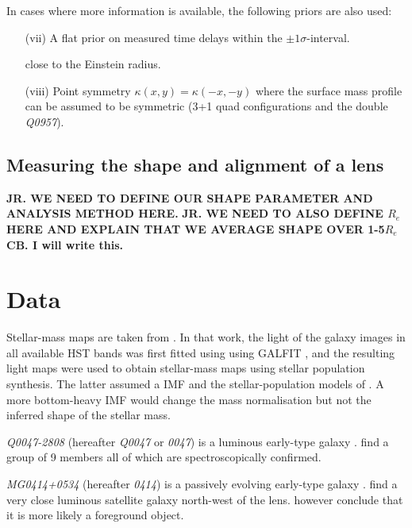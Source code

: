 \documentclass[useAMS,usenatbib]{mn2e}
\begin{document}
In cases where more information is available, the following priors are also used:

\begin{enumerate}
\item[(vii)] A flat prior on measured time delays within the $\pm 1\sigma$-interval.

close to the Einstein radius.

\item[(viii)] Point symmetry $\kappa(x,y) = \kappa(-x,-y)$ where 
the surface mass profile can be assumed to be symmetric (3+1 quad
configurations and the double \textit{Q0957}).

\end{enumerate}

\subsection{Measuring the shape and alignment of a lens}\label{sec:shapemethod}

{\bf JR. WE NEED TO DEFINE OUR SHAPE PARAMETER AND ANALYSIS METHOD HERE.} 
{\bf JR. WE NEED TO ALSO DEFINE $R_e$ HERE AND EXPLAIN THAT WE AVERAGE SHAPE OVER 1-5$R_e$} 
{\bf CB. I will write this.} 


\section{Data}\label{sec:data}

Stellar-mass maps are taken from \cite{2011ApJ...740...97L}.  In that
work, the light of the galaxy images in all available HST bands was
first fitted using using GALFIT \citep{2002AJ....124..266P}, and the
resulting light maps were used to obtain stellar-mass maps using
stellar population synthesis.  The latter assumed a
\cite{2003PASP..115..763C} IMF and the stellar-population models of
\cite{2003MNRAS.344.1000B}.  A more bottom-heavy IMF would change the
mass normalisation \citep[cf.][]{2014ApJ...793...96S} but not the
inferred shape of the stellar mass.

\textit{Q0047-2808} (hereafter \textit{Q0047} or \textit{0047}) is a luminous early-type galaxy \citep{1996MNRAS.278..139W}. \cite{2011ApJ...726...84W} find a group of 9 members all of which are spectroscopically confirmed.

\textit{MG0414+0534} (hereafter \textit{0414}) is a passively evolving early-type galaxy \citep{1999AJ....117.2034T}. \cite{1993AJ....105....1S} find a very close luminous satellite galaxy north-west of the lens. \citep{2011MNRAS.413L..86C} however conclude that it is more likely a foreground object.
\end{document}

